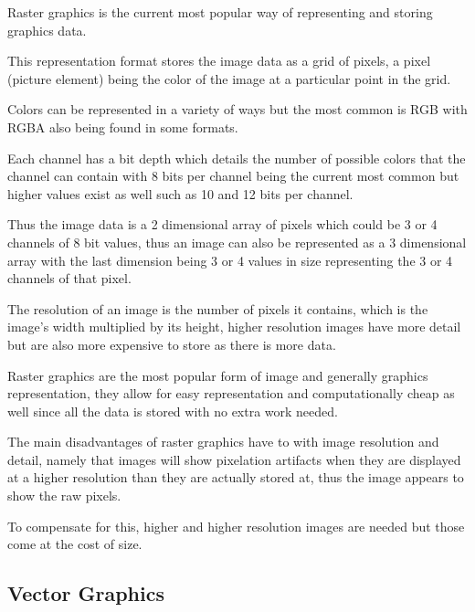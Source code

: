 \documentclass[12pt]{article}
\newcommand{\sentence}{} %
\begin{document}
    \tab
    Raster graphics is the current most popular way of representing and storing graphics data.
    \sentence
    This representation format stores the image data as a grid of pixels, a pixel (picture element) being the color
    of the image at a particular point in the grid.
    \sentence
    Colors can be represented in a variety of ways but the most common is RGB with RGBA also being found in some
    formats.
    \sentence
    Each channel has a bit depth which details the number of possible colors that the channel can contain with 8 bits
    per channel being the current most common but higher values exist as well such as 10 and 12 bits per channel.
    \sentence
    Thus the image data is a 2 dimensional array of pixels which could be 3 or 4 channels of 8 bit values, thus an
    image can also be represented as a 3 dimensional array with the last dimension being 3 or 4 values in size
    representing the 3 or 4 channels of that pixel.
    \sentence
    The resolution of an image is the number of pixels it contains, which is the image's width multiplied by its
    height, higher resolution images have more detail but are also more expensive to store as there is more data.
    \sentence
    Raster graphics are the most popular form of image and generally graphics representation, they allow for easy
    representation and computationally cheap as well since all the data is stored with no extra work needed.
    \sentence
    The main disadvantages of raster graphics have to with image resolution and detail, namely that images will show
    pixelation artifacts when they are displayed at a higher resolution than they are actually stored at, thus the
    image appears to show the raw pixels.
    \sentence
    To compensate for this, higher and higher resolution images are needed but those come at the cost of size.
    \sentence
    \sentence

    \subsection{Vector Graphics}\label{subsec:vector-graphics}

\end{document}
